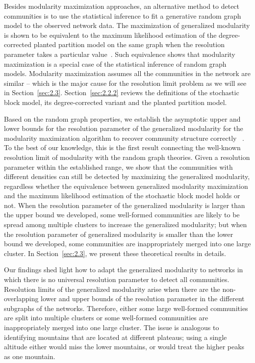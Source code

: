 Besides modularity maximization approaches, an alternative method to detect communities is to use the statistical inference to fit a generative random graph model to the observed network data. The maximization of generalized modularity is shown to be equivalent to the maximum likelihood estimation of the degree-corrected planted partition model on the same graph when the resolution parameter takes a particular value~\cite{newman2016equivalence}. Such equivalence shows that modularity maximization is a special case of the statistical inference of random graph models. Modularity maximization assumes all the communities in the network are similar – which is the major cause for the resolution limit problem as we will see in Section~\ref{sec:2.3}. Section~\ref{sec:2.2.2} reviews the definitions of the stochastic block model, its degree-corrected variant and the planted partition model.

Based on the random graph properties, we establish the asymptotic upper and lower bounds for the resolution parameter of the generalized modularity for the modularity maximization algorithm to recover community structure correctly
~\cite{lu2019asymptotic}. To the best of our knowledge, this is the first result connecting the well-known resolution limit of modularity with the random graph theories. Given a resolution parameter within the established range, we show that the communities with different densities can still be detected by maximizing the generalized modularity, regardless whether the equivalence between generalized modularity maximization and the maximum likelihood estimation of the stochastic block model holds or not. When the resolution parameter of the generalized modularity is larger than the upper bound we developed, some well-formed communities are likely to be spread among multiple clusters to increase the generalized modularity; but when the resolution parameter of generalized modularity is smaller than the lower bound we developed, some communities are inappropriately merged into one large cluster. In Section~\ref{sec:2.3}, we present these theoretical results in details.

Our findings shed light how to adapt the generalized modularity to networks in which there is no universal resolution parameter to detect all communities. Resolution limits of the generalized modularity arise when there are the non-overlapping lower and upper bounds of the resolution parameter in the different subgraphs of the networks. Therefore, either some large well-formed communities are split into multiple clusters or some well-formed communities are inappropriately merged into one large cluster. The issue is analogous to identifying mountains that are located at different plateaus; using a single altitude either would miss the lower mountains, or would treat the higher peaks as one mountain. 

